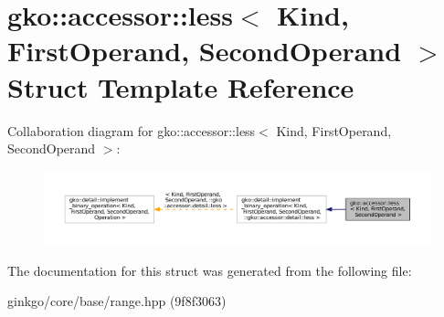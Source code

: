 \hypertarget{structgko_1_1accessor_1_1less}{}\section{gko\+:\+:accessor\+:\+:less$<$ Kind, First\+Operand, Second\+Operand $>$ Struct Template Reference}
\label{structgko_1_1accessor_1_1less}


Collaboration diagram for gko\+:\+:accessor\+:\+:less$<$ Kind, First\+Operand, Second\+Operand $>$\+:
\nopagebreak
\begin{figure}[H]
\begin{center}
\leavevmode
\includegraphics[width=350pt]{structgko_1_1accessor_1_1less__coll__graph}
\end{center}
\end{figure}


The documentation for this struct was generated from the following file\+:\begin{DoxyCompactItemize}
\item 
ginkgo/core/base/range.\+hpp (9f8f3063)\end{DoxyCompactItemize}
